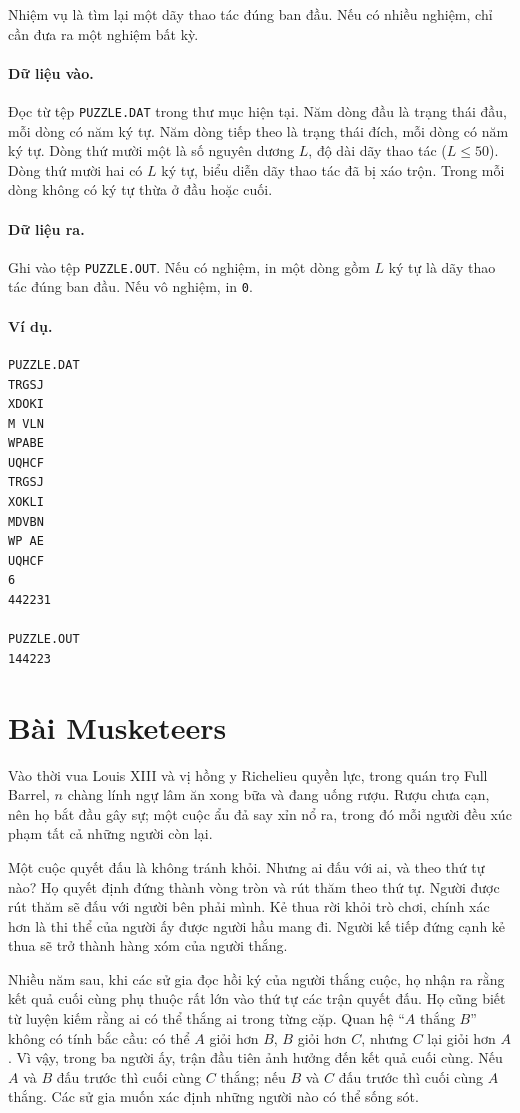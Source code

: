 \documentclass[11pt]{article}
\begin{document}
Nhiệm vụ là tìm lại một dãy thao tác đúng ban đầu. Nếu có nhiều nghiệm, chỉ
cần đưa ra một nghiệm bất kỳ.

\paragraph{Dữ liệu vào.}
Đọc từ tệp \texttt{PUZZLE.DAT} trong thư mục hiện tại. Năm dòng đầu là trạng
thái đầu, mỗi dòng có năm ký tự. Năm dòng tiếp theo là trạng thái đích, mỗi
dòng có năm ký tự. Dòng thứ mười một là số nguyên dương $L$, độ dài dãy thao
tác ($L\le 50$). Dòng thứ mười hai có $L$ ký tự, biểu diễn dãy thao tác đã bị
xáo trộn. Trong mỗi dòng không có ký tự thừa ở đầu hoặc cuối.

\paragraph{Dữ liệu ra.}
Ghi vào tệp \texttt{PUZZLE.OUT}. Nếu có nghiệm, in một dòng gồm $L$ ký tự là
dãy thao tác đúng ban đầu. Nếu vô nghiệm, in \texttt{0}.

\paragraph{Ví dụ.}
\begin{verbatim}
PUZZLE.DAT
TRGSJ
XDOKI
M VLN
WPABE
UQHCF
TRGSJ
XOKLI
MDVBN
WP AE
UQHCF
6
442231

PUZZLE.OUT
144223
\end{verbatim}

\section{Bài Musketeers}

Vào thời vua Louis XIII và vị hồng y Richelieu quyền lực, trong quán trọ Full
Barrel, $n$ chàng lính ngự lâm ăn xong bữa và đang uống rượu. Rượu chưa cạn,
nên họ bắt đầu gây sự; một cuộc ẩu đả say xỉn nổ ra, trong đó mỗi người đều
xúc phạm tất cả những người còn lại.

Một cuộc quyết đấu là không tránh khỏi. Nhưng ai đấu với ai, và theo thứ tự
nào? Họ quyết định đứng thành vòng tròn và rút thăm theo thứ tự. Người được
rút thăm sẽ đấu với người bên phải mình. Kẻ thua rời khỏi trò chơi, chính xác
hơn là thi thể của người ấy được người hầu mang đi. Người kế tiếp đứng cạnh
kẻ thua sẽ trở thành hàng xóm của người thắng.

Nhiều năm sau, khi các sử gia đọc hồi ký của người thắng cuộc, họ nhận ra
rằng kết quả cuối cùng phụ thuộc rất lớn vào thứ tự các trận quyết đấu. Họ
cũng biết từ luyện kiếm rằng ai có thể thắng ai trong từng cặp. Quan hệ
``$A$ thắng $B$'' không có tính bắc cầu: có thể $A$ giỏi hơn $B$, $B$ giỏi hơn
$C$, nhưng $C$ lại giỏi hơn $A$. Vì vậy, trong ba người ấy, trận đầu tiên ảnh
hưởng đến kết quả cuối cùng. Nếu $A$ và $B$ đấu trước thì cuối cùng $C$ thắng;
nếu $B$ và $C$ đấu trước thì cuối cùng $A$ thắng. Các sử gia muốn xác định
những người nào có thể sống sót.
\end{document}
